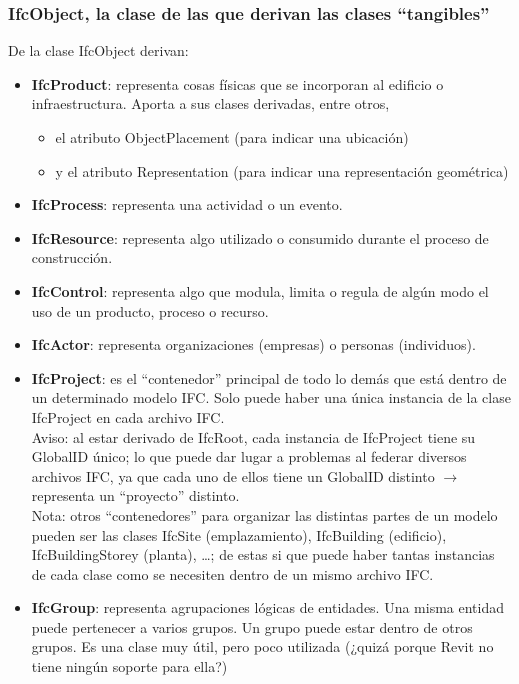 \documentclass[spanish,10pt,a4paper,final,oneside]{article}
\begin{document}
\subsubsection{IfcObject, la clase de las que derivan las clases ``tangibles''}
De la clase IfcObject derivan:
\begin{itemize}
\item \textbf{IfcProduct}: representa cosas físicas que se incorporan al edificio o infraestructura. Aporta a sus clases derivadas, entre otros,
\begin{itemize}
\item el atributo ObjectPlacement (para indicar una ubicación)
\item y el atributo Representation (para indicar una representación geométrica)
\end{itemize}

\item \textbf{IfcProcess}: representa una actividad o un evento.

\item \textbf{IfcResource}: representa algo utilizado o consumido durante el proceso de construcción.

\item \textbf{IfcControl}: representa algo que modula, limita o regula de algún modo el uso de un producto, proceso o recurso.

\item \textbf{IfcActor}: representa organizaciones (empresas) o personas (individuos).

\item \textbf{IfcProject}: es el ``contenedor'' principal de todo lo demás que está dentro de un determinado modelo IFC. Solo puede haber una única instancia de la clase IfcProject en cada archivo IFC.
\\Aviso: al estar derivado de IfcRoot, cada instancia de IfcProject tiene su GlobalID único; lo que puede dar lugar a problemas al federar diversos archivos IFC, ya que cada uno de ellos tiene un GlobalID distinto $\rightarrow$ representa un ``proyecto'' distinto. 
\\Nota: otros ``contenedores'' para organizar las distintas partes de un modelo pueden ser las clases IfcSite (emplazamiento), IfcBuilding (edificio), IfcBuildingStorey (planta), \ldots; de estas si que puede haber tantas instancias de cada clase como se necesiten dentro de un mismo archivo IFC. 

\item \textbf{IfcGroup}: representa agrupaciones lógicas de entidades. Una misma entidad puede pertenecer a varios grupos. Un grupo puede estar dentro de otros grupos. Es una clase muy útil, pero poco utilizada (¿quizá porque Revit no tiene ningún soporte para ella?)
\end{itemize}
\end{document}
